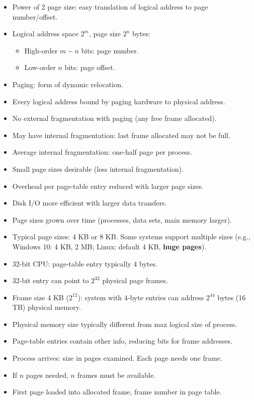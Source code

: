 \begin{itemize}
    \item Power of 2 page size: easy translation of logical address to page number/offset.
    \item Logical address space $2^m$, page size $2^n$ bytes:
    \begin{itemize}
        \item High-order $m-n$ bits: page number.
        \item Low-order $n$ bits: page offset.
    \end{itemize}
    \item Paging: form of dynamic relocation.
    \item Every logical address bound by paging hardware to physical address.
    \item No external fragmentation with paging (any free frame allocated).
    \item May have internal fragmentation: last frame allocated may not be full.
    \item Average internal fragmentation: one-half page per process.
    \item Small page sizes desirable (less internal fragmentation).
    \item Overhead per page-table entry reduced with larger page sizes.
    \item Disk I/O more efficient with larger data transfers.
    \item Page sizes grown over time (processes, data sets, main memory larger).
    \item Typical page sizes: 4 KB or 8 KB. Some systems support multiple sizes (e.g., Windows 10: 4 KB, 2 MB; Linux: default 4 KB, \textbf{huge pages}).
    \item 32-bit CPU: page-table entry typically 4 bytes.
    \item 32-bit entry can point to $2^{32}$ physical page frames.
    \item Frame size 4 KB ($2^{12}$): system with 4-byte entries can address $2^{44}$ bytes (16 TB) physical memory.
    \item Physical memory size typically different from max logical size of process.
    \item Page-table entries contain other info, reducing bits for frame addresses.
    \item Process arrives: size in pages examined. Each page needs one frame.
    \item If $n$ pages needed, $n$ frames must be available.
    \item First page loaded into allocated frame, frame number in page table.

\end{itemize}
